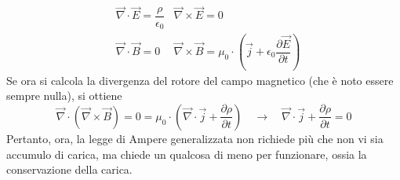 \documentclass[a4paper]{extarticle}
\begin{document}
\begin{align*}
  &\vec \nabla \cdot \vec E = \dfrac{\rho}{\epsilon_0} & \vec \nabla \times \vec E = 0\\
  &\vec \nabla \cdot \vec B = 0 & \vec \nabla \times \vec B = \mu_0 \cdot \left(\vec j + \epsilon_0 \dfrac{\partial \vec E}{\partial t}\right)
\end{align*}
Se ora si calcola la divergenza del rotore del campo magnetico (che è noto essere sempre nulla), si ottiene
\[\vec \nabla \cdot \left(\vec \nabla \times \vec B\right) = 0 = \mu_0 \cdot \left(\vec \nabla \cdot \vec j + \dfrac{\partial \rho}{\partial t}\right) \hspace{1em} \rightarrow \hspace{1em} \vec \nabla \cdot \vec j + \dfrac{\partial \rho}{\partial t} = 0\]
Pertanto, ora, la legge di Ampere generalizzata non richiede più che non vi sia accumulo di carica, ma chiede un qualcosa di meno per funzionare, ossia la conservazione della carica.
\end{document}
